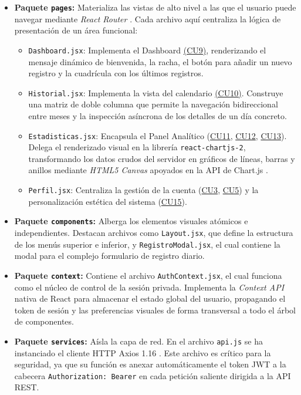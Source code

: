\begin{itemize}
    \item \textbf{Paquete \texttt{pages}:} Materializa las vistas de alto nivel a las que el usuario puede navegar mediante \textit{React Router} \cite{bib:react_router}. Cada archivo aquí centraliza la lógica de presentación de un área funcional:
          \begin{itemize}
              \item \texttt{Dashboard.jsx}: Implementa el Dashboard \hyperref[tab:esp_cu9]{(CU9)}, renderizando el mensaje dinámico de bienvenida, la racha, el botón para añadir un nuevo registro y la cuadrícula con los últimos registros.
              \item \texttt{Historial.jsx}: Implementa la vista del calendario \hyperref[tab:esp_cu10]{(CU10)}. Construye una matriz de doble columna que permite la navegación bidireccional entre meses y la inspección asíncrona de los detalles de un día concreto.
              \item \texttt{Estadisticas.jsx}: Encapsula el Panel Analítico (\hyperref[tab:esp_cu11]{CU11}, \hyperref[tab:esp_cu12]{CU12}, \hyperref[tab:esp_cu13]{CU13}). Delega el renderizado visual en la librería \texttt{react-chartjs-2}, transformando los datos crudos del servidor en gráficos de líneas, barras y anillos mediante \textit{HTML5 Canvas} apoyados en la API de Chart.js \cite{bib:chartjs}.
              \item \texttt{Perfil.jsx}: Centraliza la gestión de la cuenta (\hyperref[tab:esp_cu3]{CU3}, \hyperref[tab:esp_cu5]{CU5}) y la personalización estética del sistema (\hyperref[tab:esp_cu15]{CU15}).
          \end{itemize}

    \item \textbf{Paquete \texttt{components}:} Alberga los elementos visuales atómicos e independientes. Destacan archivos como \texttt{Layout.jsx}, que define la estructura de los menús superior e inferior, y \texttt{RegistroModal.jsx}, el cual contiene la modal para el complejo formulario de registro diario.

    \item \textbf{Paquete \texttt{context}:} Contiene el archivo \texttt{AuthContext.jsx}, el cual funciona como el núcleo de control de la sesión privada. Implementa la \textit{Context API} nativa de React para almacenar el estado global del usuario, propagando el token de sesión y las preferencias visuales de forma transversal a todo el árbol de componentes.

    \item \textbf{Paquete \texttt{services}:} Aísla la capa de red. En el archivo \texttt{api.js} se ha instanciado el cliente HTTP Axios 1.16 \cite{bib:axios}. Este archivo es crítico para la seguridad, ya que su función es anexar automáticamente el token JWT a la cabecera \texttt{Authorization: Bearer} en cada petición saliente dirigida a la API REST.
\end{itemize}

